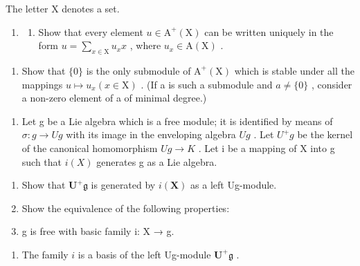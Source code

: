 
The letter X denotes a set.

\begin{enumerate}
\def\labelenumi{\arabic{enumi}.}
\tightlist
\item
  \begin{enumerate}
  \def\labelenumii{(\alph{enumii})}
  \tightlist
  \item
    Show that every element \(u \in \mathrm{A}^{+}(\mathrm{X})\) can be written uniquely in the form \(u = \sum_{x \in \mathrm{X}} u_{x} x\) , where \(u_{x} \in \mathrm{A}(\mathrm{X})\) .
  \end{enumerate}
\end{enumerate}

\begin{enumerate}
\def\labelenumi{(\alph{enumi})}
\setcounter{enumi}{1}
\tightlist
\item
  Show that \(\{0\}\) is the only submodule of \(\mathrm{A}^{+}(\mathrm{X})\) which is stable under all the mappings \(u \mapsto u_{x} (x \in \mathrm{X})\) . (If a is such a submodule and \(a \neq \{0\}\) , consider a non-zero element of a of minimal degree.)
\end{enumerate}

\begin{enumerate}
\def\labelenumi{\arabic{enumi}.}
\setcounter{enumi}{1}
\tightlist
\item
  Let g be a Lie algebra which is a free module; it is identified by means of \(\sigma: g \to Ug\) with its image in the enveloping algebra \(Ug\) . Let \(U^{+}g\) be the kernel of the canonical homomorphism \(Ug \to K\) . Let i be a mapping of X into g such that \(i(X)\) generates g as a Lie algebra.
\end{enumerate}

\begin{enumerate}
\def\labelenumi{(\alph{enumi})}
\item
  Show that \(\mathbf{U}^{+}\mathfrak{g}\) is generated by \(i(\mathbf{X})\) as a left Ug-module.
\item
  Show the equivalence of the following properties:
\item
  g is free with basic family i: X → g.
\end{enumerate}

\begin{enumerate}
\def\labelenumi{(\roman{enumi})}
\setcounter{enumi}{1}
\tightlist
\item
  The family \(i\) is a basis of the left Ug-module \(\mathbf{U}^{+}\mathfrak{g}\) .
\end{enumerate}

